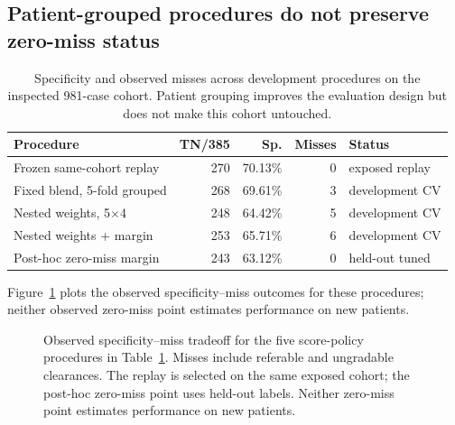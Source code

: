 \documentclass[11pt]{article}
\begin{document}
\subsection{Patient-grouped procedures do not preserve zero-miss status}
\begin{table}[t]
\centering
\caption{Specificity and observed misses across development procedures on the inspected 981-case cohort. Patient grouping improves the evaluation design but does not make this cohort untouched.}
\label{tab:procedures}
\begin{tabular}{lrrrl}
\toprule
Procedure & TN/385 & Sp. & Misses & Status \\
\midrule
Frozen same-cohort replay & 270 & 70.13\% & 0 & exposed replay \\
Fixed blend, 5-fold grouped & 268 & 69.61\% & 3 & development CV \\
Nested weights, 5$\times$4 & 248 & 64.42\% & 5 & development CV \\
Nested weights + margin & 253 & 65.71\% & 6 & development CV \\
Post-hoc zero-miss margin & 243 & 63.12\% & 0 & held-out tuned \\
\bottomrule
\end{tabular}
\end{table}

Figure~\ref{fig:tradeoff} plots the observed specificity--miss outcomes for these procedures; neither observed zero-miss point estimates performance on new patients.

\begin{figure}[t]
\centering
{}
\caption{Observed specificity--miss tradeoff for the five score-policy procedures in Table~\ref{tab:procedures}. Misses include referable and ungradable clearances. The replay is selected on the same exposed cohort; the post-hoc zero-miss point uses held-out labels. Neither zero-miss point estimates performance on new patients.}
\label{fig:tradeoff}
\end{figure}
\end{document}
